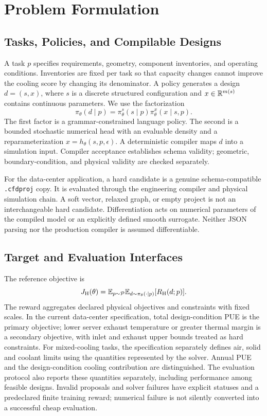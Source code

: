 \section{Problem Formulation}
\subsection{Tasks, Policies, and Compilable Designs}
A task $p$ specifies requirements, geometry, component inventories, and operating conditions. Inventories are fixed per task so that capacity changes cannot improve the cooling score by changing its denominator. A policy generates a design $d=(s,x)$, where $s$ is a discrete structured configuration and $x\in\mathbb{R}^{m(s)}$ contains continuous parameters. We use the factorization
\begin{equation}
\pi_\theta(d\mid p)=\pi_\theta^{s}(s\mid p)\pi_\theta^{x}(x\mid s,p).
\label{eq:policy}
\end{equation}
The first factor is a grammar-constrained language policy. The second is a bounded stochastic numerical head with an evaluable density and a reparameterization $x=h_\theta(s,p,\epsilon)$. A deterministic compiler maps $d$ into a simulation input. Compiler acceptance establishes schema validity; geometric, boundary-condition, and physical validity are checked separately.

For the data-center application, a hard candidate is a genuine schema-compatible \texttt{.cfdproj} copy. It is evaluated through the engineering compiler and physical simulation chain. A soft vector, relaxed graph, or empty project is not an interchangeable hard candidate. Differentiation acts on numerical parameters of the compiled model or an explicitly defined smooth surrogate. Neither JSON parsing nor the production compiler is assumed differentiable.

\subsection{Target and Evaluation Interfaces}
The reference objective is
\begin{equation}
J_{\mathrm{H}}(\theta)=\mathbb{E}_{p\sim\mathcal P}\mathbb{E}_{d\sim\pi_\theta(\cdot\mid p)}[R_{\mathrm{H}}(d;p)].
\label{eq:target}
\end{equation}
The reward aggregates declared physical objectives and constraints with fixed scales. In the current data-center specification, total design-condition PUE is the primary objective; lower server exhaust temperature or greater thermal margin is a secondary objective, with inlet and exhaust upper bounds treated as hard constraints. For mixed-cooling tasks, the specification separately defines air, solid and coolant limits using the quantities represented by the solver. Annual PUE and the design-condition cooling contribution are distinguished. The evaluation protocol also reports these quantities separately, including performance among feasible designs. Invalid proposals and solver failures have explicit statuses and a predeclared finite training reward; numerical failure is not silently converted into a successful cheap evaluation.


